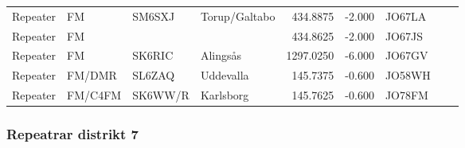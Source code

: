 \begin{longtable}{llllrrlcl}
	Repeater & FM              & SM6SXJ   & Torup/Galtabo         &   434.8875 &   -2.000 & JO67LA &  &  \\
	Repeater & FM              &          &                       &   434.8625 &   -2.000 & JO67JS &  &  \\
	Repeater & FM              & SK6RIC   & Alingsås              &  1297.0250 &   -6.000 & JO67GV &  &  \\
	Repeater & FM/DMR          & SL6ZAQ   & Uddevalla             &   145.7375 &   -0.600 & JO58WH &  &  \\
	Repeater & FM/C4FM         & SK6WW/R  & Karlsborg             &   145.7625 &   -0.600 & JO78FM &  &
\end{longtable}

\subsubsection{Repeatrar distrikt 7}

